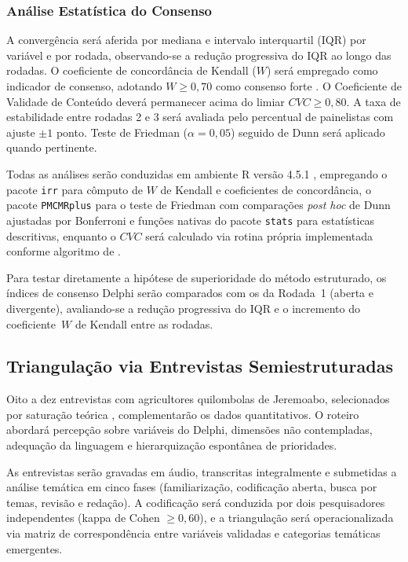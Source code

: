 \documentclass[3p,times]{elsarticle}
\begin{document}
\subsubsection{Análise Estatística do Consenso}

A convergência será aferida por mediana e intervalo interquartil (IQR) por variável e por rodada, observando-se a redução progressiva do IQR ao longo das rodadas. O coeficiente de concordância de Kendall ($W$) será empregado como indicador de consenso, adotando $W \geq 0{,}70$ como consenso forte \citep{Schmidt2014}. O Coeficiente de Validade de Conteúdo \citep{Hernandez-Nieto2002} deverá permanecer acima do limiar $CVC \geq 0{,}80$. A taxa de estabilidade entre rodadas 2 e 3 será avaliada pelo percentual de painelistas com ajuste $\pm 1$ ponto. Teste de Friedman ($\alpha = 0,05$) seguido de Dunn será aplicado quando pertinente.

Todas as análises serão conduzidas em ambiente R versão 4.5.1 \citep{RCore2024}, empregando o pacote \texttt{irr} para cômputo de $W$ de Kendall e coeficientes de concordância, o pacote \texttt{PMCMRplus} para o teste de Friedman com comparações \textit{post hoc} de Dunn ajustadas por Bonferroni e funções nativas do pacote \texttt{stats} para estatísticas descritivas, enquanto o $CVC$ será calculado via rotina própria implementada conforme algoritmo de \citet{Hernandez-Nieto2002}.

Para testar diretamente a hipótese de superioridade do método estruturado, os índices de consenso Delphi serão comparados com os da Rodada~1 (aberta e divergente), avaliando-se a redução progressiva do IQR e o incremento do coeficiente~$W$ de Kendall entre as rodadas.

\subsection{Triangulação via Entrevistas Semiestruturadas}

Oito a dez entrevistas com agricultores quilombolas de Jeremoabo, selecionados por saturação teórica \citep{Glaser1967}, complementarão os dados quantitativos. O roteiro abordará percepção sobre variáveis do Delphi, dimensões não contempladas, adequação da linguagem e hierarquização espontânea de prioridades.

As entrevistas serão gravadas em áudio, transcritas integralmente e submetidas a análise temática \citep{Braun2006} em cinco fases (familiarização, codificação aberta, busca por temas, revisão e redação). A codificação será conduzida por dois pesquisadores independentes (kappa de Cohen $\geq 0{,}60$), e a triangulação será operacionalizada via matriz de correspondência entre variáveis validadas e categorias temáticas emergentes.
\end{document}
